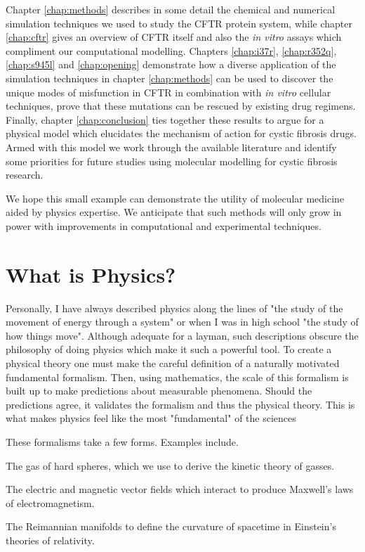Chapter \ref{chap:methods} describes in some detail the chemical and numerical simulation techniques we used to study the CFTR protein system, while chapter \ref{chap:cftr} gives an overview of CFTR itself and also the \textit {in vitro} assays which compliment our computational modelling.  Chapters \ref{chap:i37r}, \ref{chap:r352q}, \ref{chap:s945l} and \ref{chap:opening} demonstrate how a diverse application of the simulation techniques in chapter \ref{chap:methods} can be used to discover the unique modes of misfunction in CFTR in combination with \textit {in vitro} cellular techniques, prove that these mutations can be rescued by existing drug regimens. Finally, chapter \ref{chap:conclusion} ties together these results to argue for a physical model which elucidates the mechanism of action for cystic fibrosis drugs. Armed with this model we work through the available literature and identify some priorities for future studies using molecular modelling for cystic fibrosis research.

We hope this small example can demonstrate the utility of molecular medicine aided by physics expertise. We anticipate that such methods will only grow in power with improvements in computational and experimental techniques.

\section{What is Physics?}
Personally, I have always described physics along the lines of "the study of the movement of energy through a system" or when I was in high school "the study of how things move". Although adequate for a layman, such descriptions obscure the philosophy of doing physics which make it such a powerful tool. To create a physical theory one must make the careful definition of a naturally motivated fundamental formalism. Then, using mathematics, the scale of this formalism is built up to make predictions about measurable phenomena. Should the predictions agree, it validates the formalism and thus the physical theory. This is what makes physics feel like the most "fundamental" of the sciences

These formalisms take a few forms. Examples include.

The gas of hard spheres, which we use to derive the kinetic theory of gasses.  

The electric and magnetic vector fields which interact to produce Maxwell's laws of electromagnetism.

The Reimannian manifolds to define the curvature of spacetime in Einstein's theories of relativity.


